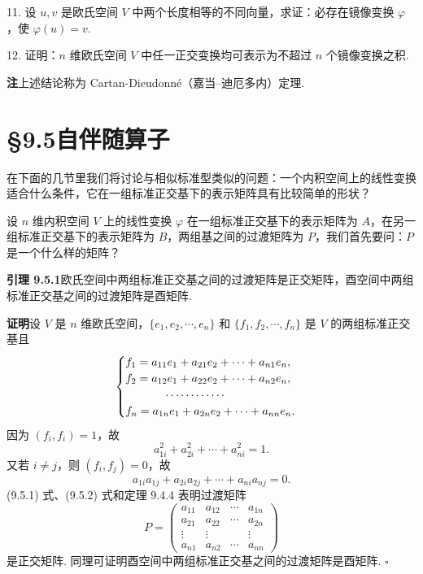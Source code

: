 \documentclass[UTF8, 12pt, fontset=fandol, oneside]{ctexart}
\begin{document}
11. 设 $u,v$ 是欧氏空间 $V$ 中两个长度相等的不同向量，求证：必存在镜像变换 $\varphi$，使 $\varphi(u)=v$.

12. 证明：$n$ 维欧氏空间 $V$ 中任一正交变换均可表示为不超过 $n$ 个镜像变换之积.

\noindent\textbf{注}\quad 上述结论称为 Cartan-Dieudonn\'e（嘉当--迪厄多内）定理.

\section*{§9.5\quad 自伴随算子}

在下面的几节里我们将讨论与相似标准型类似的问题：一个内积空间上的线性变换适合什么条件，它在一组标准正交基下的表示矩阵具有比较简单的形状？

设 $n$ 维内积空间 $V$ 上的线性变换 $\varphi$ 在一组标准正交基下的表示矩阵为 $A$，在另一组标准正交基下的表示矩阵为 $B$，两组基之间的过渡矩阵为 $P$，我们首先要问：$P$ 是一个什么样的矩阵？

\noindent\textbf{引理 9.5.1}\quad 欧氏空间中两组标准正交基之间的过渡矩阵是正交矩阵，酉空间中两组标准正交基之间的过渡矩阵是酉矩阵.

\noindent\textbf{证明}\quad 设 $V$ 是 $n$ 维欧氏空间，$\{e_1,e_2,\cdots,e_n\}$ 和 $\{f_1,f_2,\cdots,f_n\}$ 是 $V$ 的两组标准正交基且
\[
  \begin{cases}
    f_1=a_{11}e_1+a_{21}e_2+\cdots+a_{n1}e_n,\\
    f_2=a_{12}e_1+a_{22}e_2+\cdots+a_{n2}e_n,\\
    \hspace{3.5em}\cdots\cdots\cdots\cdots\\
    f_n=a_{1n}e_1+a_{2n}e_2+\cdots+a_{nn}e_n.
  \end{cases}
\]
因为 $(f_i,f_i)=1$，故
\begin{equation}
  a_{1i}^2+a_{2i}^2+\cdots+a_{ni}^2=1.
  \tag{9.5.1}
\end{equation}
又若 $i\ne j$，则 $(f_i,f_j)=0$，故
\begin{equation}
  a_{1i}a_{1j}+a_{2i}a_{2j}+\cdots+a_{ni}a_{nj}=0.
  \tag{9.5.2}
\end{equation}
(9.5.1) 式、(9.5.2) 式和定理 9.4.4 表明过渡矩阵
\[
  P=
  \left(\begin{array}{cccc}
    a_{11} & a_{12} & \cdots & a_{1n}\\
    a_{21} & a_{22} & \cdots & a_{2n}\\
    \vdots & \vdots & & \vdots\\
    a_{n1} & a_{n2} & \cdots & a_{nn}
  \end{array}\right)
\]
是正交矩阵. 同理可证明酉空间中两组标准正交基之间的过渡矩阵是酉矩阵. $\square$
\end{document}
